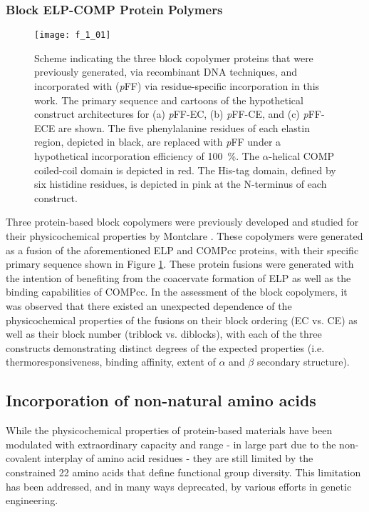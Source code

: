 \begin{refsection}
\subsubsection{Block ELP-COMP Protein Polymers}
\begin{figure}[h!]
    \centering
    \texttt{[image: f\_1\_01]}
    \caption{Scheme indicating the three block copolymer proteins that were
        previously generated, via recombinant DNA techniques, and incorporated
        with  (\emph{p}FF) via residue-specific
        incorporation in this work. The primary sequence and cartoons of
        the hypothetical construct architectures for (a) \emph{p}FF-EC, (b)
        \emph{p}FF-CE, and (c) \emph{p}FF-ECE are shown. The five phenylalanine
        residues of each elastin region, depicted in black, are replaced with
        \emph{p}FF under a hypothetical incorporation efficiency of
        \SI{100}{\percent}. The ${\alpha}$-helical COMP coiled-coil domain is
        depicted in red. The His-tag domain, defined by six histidine residues,
        is depicted in pink at the N-terminus of each construct.
    }
    \label{fig:pff_proteins}
\end{figure}
Three protein-based block copolymers were previously developed and studied for
their physicochemical properties by Montclare .\cite{Haghpanah2010,Haghpanah2009} These copolymers were generated as a
fusion of the aforementioned ELP and COMPcc proteins, with their specific
primary sequence shown in Figure \ref{fig:pff_proteins}. These protein fusions
were generated with the intention of benefiting from the coacervate formation
of ELP as well as the binding capabilities of COMPcc. In the assessment of the
block copolymers, it was observed that there existed an unexpected dependence of
the physicochemical properties of the fusions on their block ordering (EC vs.
CE) as well as their block number (triblock vs. diblocks), with each of the
three constructs demonstrating distinct degrees of the expected properties (i.e.
thermoresponsiveness, binding affinity, extent of ${\alpha}$ and ${\beta}$
secondary structure).\cite{Haghpanah2010,Haghpanah2009}

\subsection{Incorporation of non-natural amino acids}

While the physicochemical properties of protein-based materials have been
modulated with extraordinary capacity and range - in large part due to
the non-covalent interplay of amino acid residues - they are still limited by
the constrained 22 amino acids that define functional group diversity.
This limitation has been addressed, and in many ways deprecated, by various
efforts in genetic engineering.


\end{refsection}
